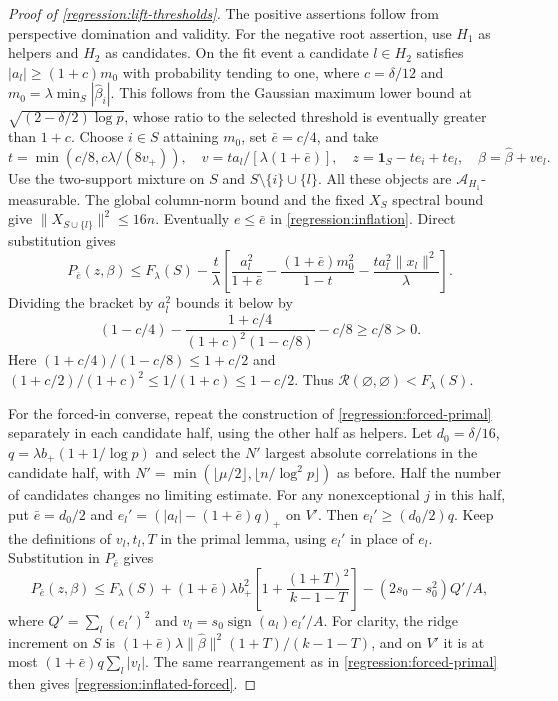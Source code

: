 \begin{proof}[Proof of \cref{regression:lift-thresholds}]
The positive assertions follow from perspective domination and validity.
For the negative root assertion, use $H_1$ as helpers and $H_2$ as
candidates. On the fit event a candidate $l\in H_2$ satisfies
$|a_l|\geq(1+c)m_0$ with probability tending to one, where
$c=\delta/12$ and $m_0=\lambda\min_S|\widehat\beta_i|$.
This follows from the Gaussian maximum lower bound at
$\sqrt{(2-\delta/2)\log p}$, whose ratio to the selected threshold
is eventually greater than $1+c$.
Choose $i\in S$ attaining $m_0$, set $\bar e=c/4$, and take
\[
 t=\min(c/8,c\lambda/(8v_+)),\quad
 v=t a_l/[\lambda(1+\bar e)],\quad
 z=\mathbf1_S-te_i+te_l,\quad \beta=\widehat\beta+ve_l.
\]
Use the two-support mixture on $S$ and $S\setminus\{i\}\cup\{l\}$.
All these objects are $\mathcal A_{H_1}$-measurable.
The global column-norm bound and the fixed $X_S$ spectral bound
give $\|X_{S\cup\{l\}}\|^2\leq16n$.
Eventually $e\leq\bar e$ in \eqref{regression:inflation}.
Direct substitution gives
\[
 P_{\bar e}(z,\beta)
 \leq F_\lambda(S)-\frac t\lambda
 \left[\frac{a_l^2}{1+\bar e}
       -\frac{(1+\bar e)m_0^2}{1-t}
       -\frac{t a_l^2\|x_l\|^2}{\lambda}\right].
\]
Dividing the bracket by $a_l^2$ bounds it below by
\[
 (1-c/4)
 -\frac{1+c/4}{(1+c)^2(1-c/8)}-c/8\geq c/8>0.
\]
Here $(1+c/4)/(1-c/8)\leq1+c/2$ and
$(1+c/2)/(1+c)^2\leq1/(1+c)\leq1-c/2$.
Thus $\mathcal R(\varnothing,\varnothing)<F_\lambda(S)$.

For the forced-in converse, repeat the construction of
\cref{regression:forced-primal} separately in each candidate half,
using the other half as helpers. Let $d_0=\delta/16$,
$q=\lambda b_+(1+1/\log p)$ and select the $N'$ largest
absolute correlations in the candidate half, with
$N'=\min(\lfloor\mu/2\rfloor,\lfloor n/\log^2p\rfloor)$
as before. Half the number of candidates changes no limiting estimate.
For any nonexceptional $j$ in this half, put
$\bar e=d_0/2$ and $e_l'=(|a_l|-(1+\bar e)q)_+$ on $V'$.
Then $e_l'\geq(d_0/2)q$.
Keep the definitions of $v_l,t_l,T$ in the primal lemma, using
$e_l'$ in place of $e_l$. Substitution in $P_{\bar e}$ gives
\begin{equation}\label{regression:inflated-forced}
 P_{\bar e}(z,\beta)\leq F_\lambda(S)
 +(1+\bar e)\lambda b_+^2
       \left[1+\frac{(1+T)^2}{k-1-T}\right]
                  -(2s_0-s_0^2)Q'/A,
\end{equation}
where $Q'=\sum_l(e_l')^2$ and
$v_l=s_0\operatorname{sign}(a_l)e_l'/A$.
For clarity, the ridge increment on $S$ is
$(1+\bar e)\lambda\|\widehat\beta\|^2(1+T)/(k-1-T)$,
and on $V'$ it is at most $(1+\bar e)q\sum_l|v_l|$.
The same rearrangement as in \cref{regression:forced-primal}
then gives \eqref{regression:inflated-forced}.


\end{proof}
